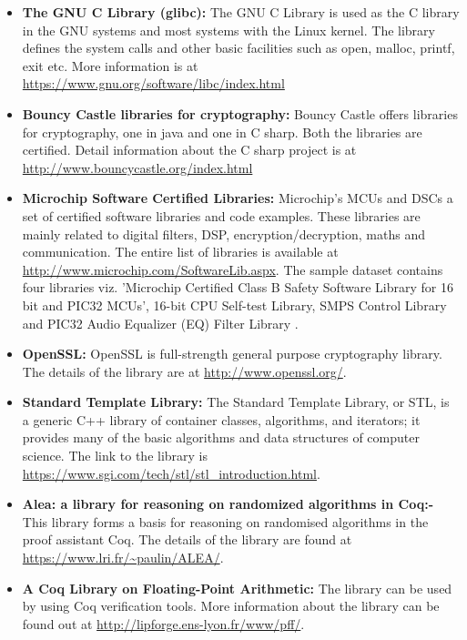 \documentclass[11pt,letterpaper]{report}
\begin{document}
\begin{itemize}
\item \textbf{The GNU C Library (glibc): } The GNU C Library is used as the C library in the GNU systems and most systems with the Linux kernel. The library defines the system calls and other basic facilities such as open, malloc, printf, exit etc. More information is at \url{https://www.gnu.org/software/libc/index.html} \cite{Glibc}
\item \textbf{Bouncy Castle libraries for cryptography: } Bouncy Castle offers libraries for cryptography, one in java and one in C sharp. Both the libraries are certified. Detail information about the C sharp project is at \url{http://www.bouncycastle.org/index.html} \cite{BCastleJava, BSharp}
\item \textbf{Microchip Software Certified Libraries: } Microchip’s MCUs and DSCs a set of certified software libraries and code examples. These libraries are mainly related to digital filters, DSP, encryption/decryption, maths and communication. The entire list of libraries is available at \url{http://www.microchip.com/SoftwareLib.aspx}. \cite{MCHIP} The sample dataset contains four libraries viz. 'Microchip Certified Class B Safety Software Library for 16 bit and PIC32 MCUs', 16-bit CPU Self-test Library, SMPS Control Library and PIC32 Audio Equalizer (EQ) Filter Library .
\item \textbf{OpenSSL: } OpenSSL is full-strength general purpose cryptography library. The details of the library are at \url{http://www.openssl.org/}. \cite{SSL}
\item \textbf{Standard Template Library: } The Standard Template Library, or STL, is a generic C++ library of container classes, algorithms, and iterators; it provides many of the basic algorithms and data structures of computer science. The link to the library is \url{https://www.sgi.com/tech/stl/stl_introduction.html}. \cite{STL}
\item \textbf{Alea: a library for reasoning on randomized algorithms in Coq:- } This library forms a basis for reasoning on randomised algorithms in the proof assistant Coq. The details of the library are found at \url{https://www.lri.fr/~paulin/ALEA/}. \cite{Alea}
\item \textbf{A Coq Library on Floating-Point Arithmetic: } The library can be used by using Coq verification tools. More information about the library can be found out at \url{http://lipforge.ens-lyon.fr/www/pff/}. \cite{DFC}
\end{itemize}
\end{document}

